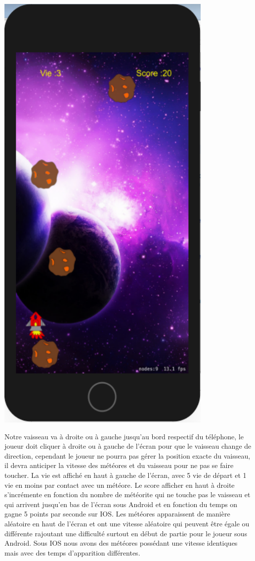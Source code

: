 \documentclass{article}
\begin{document}
   \begin{minipage}[c]{.46\linewidth}
    \begin{center}
            \includegraphics[scale=0.38]{InGameIOS.png}
        \end{center}
 \end{minipage}

Notre vaisseau va à droite ou à gauche jusqu'au bord respectif du téléphone, le joueur doit cliquer à droite ou à gauche de l'écran pour que le vaisseau change de direction, cependant le joueur ne pourra pas gérer la position exacte du vaisseau, il devra anticiper la vitesse des météores et du vaisseau pour ne pas se faire toucher.
La vie est affiché en haut à gauche de l'écran, avec 5 vie de départ et 1 vie en moins par contact avec un météore.
Le score afficher en haut à droite s'incrémente en fonction du nombre de météorite qui ne touche pas le vaisseau et qui arrivent jusqu'en bas de l'écran sous Android et en fonction du temps on gagne 5 points par seconde sur IOS. 
Les météores apparaissent de manière aléatoire en haut de l'écran et ont une vitesse aléatoire qui peuvent être égale ou différente rajoutant une difficulté surtout en début de partie pour le joueur sous Android. 
Sous IOS nous avons des météores possédant une vitesse identiques mais avec des temps d'apparition différentes.
\end{document}
